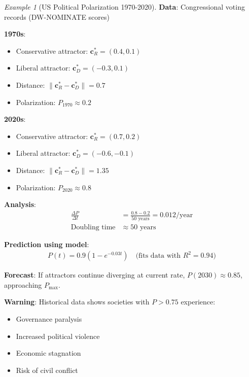 \documentclass[11pt,a4paper]{article}
\theoremstyle{definition}
\theoremstyle{remark}
\newtheorem{example}{Example}[section]
\newcommand{\cc}{\mathbf{c}}
\begin{document}
\begin{small}
\begin{enumerate}
\begin{example}[US Political Polarization 1970-2020]
\textbf{Data}: Congressional voting records (DW-NOMINATE scores)

\textbf{1970s}:
\begin{itemize}
    \item Conservative attractor: \(\cc^*_R = (0.4, 0.1)\)
    \item Liberal attractor: \(\cc^*_D = (-0.3, 0.1)\)
    \item Distance: \(\|\cc^*_R - \cc^*_D\| = 0.7\)
    \item Polarization: \(P_{1970} \approx 0.2\)
\end{itemize}

\textbf{2020s}:
\begin{itemize}
    \item Conservative attractor: \(\cc^*_R = (0.7, 0.2)\)
    \item Liberal attractor: \(\cc^*_D = (-0.6, -0.1)\)
    \item Distance: \(\|\cc^*_R - \cc^*_D\| = 1.35\)
    \item Polarization: \(P_{2020} \approx 0.8\)
\end{itemize}

\textbf{Analysis}:
\begin{align}
\frac{\Delta P}{\Delta t} &= \frac{0.8 - 0.2}{50 \text{ years}} = 0.012/\text{year} \\
\text{Doubling time} &\approx 50 \text{ years}
\end{align}

\textbf{Prediction using model}: 
\begin{align}
P(t) = 0.9(1 - e^{-0.03t}) \quad \text{(fits data with } R^2 = 0.94\text{)}
\end{align}

\textbf{Forecast}: If attractors continue diverging at current rate, \(P(2030) \approx 0.85\), approaching \(P_{\max}\).

\textbf{Warning}: Historical data shows societies with \(P > 0.75\) experience:
\begin{itemize}
    \item Governance paralysis
    \item Increased political violence
    \item Economic stagnation
    \item Risk of civil conflict
\end{itemize}
\end{example}


\end{enumerate}
\end{small}
\end{document}
